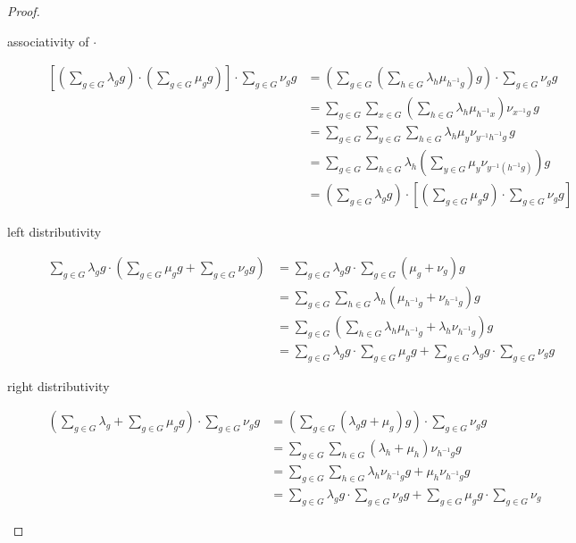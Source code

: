 \documentclass[titlepage, a4paper]{article}
\theoremstyle{remark}
\begin{document}
\begin{proof}
\begin{description}
    \item[associativity of $\cdot$]
    \begin{align*}
    \left[\left(\sum_{g \in G} \lambda_g g \right) \cdot \left(\sum_{g \in G} \mu_g g \right)\right ] \cdot \sum_{g \in G} \nu_g g
    &= \left(\sum_{g \in G} \left( \sum_{h \in G} \lambda_{h} \mu_{h^{-1}g} \right) g \right) \cdot \sum_{g \in G} \nu_g g\\
    &= \sum_{g \in G} \sum_{x \in G} \left( \sum_{h \in G} \lambda_{h} \mu_{h^{-1}x} \right) \nu_{x^{-1}g} \,g \\
    &= \sum_{g \in G} \sum_{y \in G} \sum_{h \in G} \lambda_{h} \mu_{y} \nu_{y^{-1} h^{-1}g} \, g \\
    &= \sum_{g \in G} \sum_{h \in G} \lambda_h \left(\sum_{y \in G}\mu_{y} \nu_{y^{-1} (h^{-1}g)}\right)g \\
    &= \left(\sum_{g \in G} \lambda_g g \right) \cdot \left[ \left(\sum_{g \in G} \mu_g g \right) \cdot \sum_{g \in G} \nu_g g \right]
    \end{align*}

    \item[left distributivity]
    \begin{align*}
    \sum_{g \in G} \lambda_g g \cdot \left(\sum_{g \in G} \mu_g g + \sum_{g \in G} \nu_g g \right) 
    &= \sum_{g \in G} \lambda_g g \cdot \sum_{g \in G} (\mu_g + \nu_g) g \\
    &= \sum_{g \in G} \sum_{h \in G} \lambda_h (\mu_{h^{-1}g} + \nu_{h^{-1}g}) g \\
    &= \sum_{g \in G} \left(\sum_{h \in G} \lambda_h \mu_{h^{-1}g} + \lambda_h \nu_{h^{-1}g}\right) g \\
    &= \sum_{g \in G} \lambda_g g \cdot \sum_{g \in G} \mu_g g
        + \sum_{g \in G} \lambda_g g \cdot \sum_{g \in G} \nu_g g
    \end{align*}

    \item[right distributivity]
    \begin{align*}
    \left(\sum_{g \in G} \lambda_g + \sum_{g \in G} \mu_g g\right) \cdot \sum_{g \in G} \nu_g g
    &= \left(\sum_{g \in G} (\lambda_g g + \mu_g) g\right) \cdot \sum_{g \in G} \nu_g g\\
    &= \sum_{g \in G} \sum_{h \in G} (\lambda_h + \mu_h) \nu_{h^{-1}g} g \\
    &= \sum_{g \in G} \sum_{h \in G} \lambda_h \nu_{h^{-1}g} g + \mu_h \nu_{h^{-1}g} g \\
    &= \sum_{g \in G} \lambda_g g \cdot \sum_{g \in G} \nu_g g + \sum_{g \in G} \mu_g g \cdot \sum_{g \in G} \nu_g 
    \end{align*}


\end{description}
\end{proof}
\end{document}
